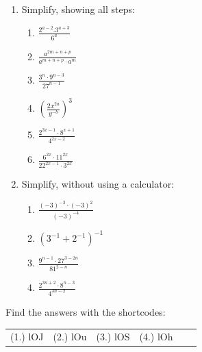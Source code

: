 \begin{enumerate}[noitemsep, label=\textbf{\arabic*}. ]
\begin{enumerate}[noitemsep, label=\textbf{\alph*}. ]
\end{enumerate}
                \label{m38359*uid44}\item Simplify, showing all steps:
\label{m38359*id68378}\begin{enumerate}[noitemsep, label=\textbf{\alph*}. ] 
            \label{m38359*uid45}\item $\frac{{2}^{a-2}.{3}^{a+3}}{{6}^{a}}$\newline
    \label{m38359*uid46}\item $\frac{{a}^{2m+n+p}}{{a}^{m+n+p}\ensuremath{\cdot}{a}^{m}}$\newline
    \label{m38359*uid47}\item $\frac{{3}^{n}\ensuremath{\cdot}{9}^{n-3}}{{27}^{n-1}}$\newline
    \label{m38359*uid48}\item ${\left(\frac{2{x}^{2a}}{{y}^{-b}}\right)}^{3}$\newline
    \newline
    \label{m38359*uid49}\item $\frac{{2}^{3x-1}\ensuremath{\cdot}{8}^{x+1}}{{4}^{2x-2}}$\newline
    \label{m38359*uid50}\item $\frac{{6}^{2x}\ensuremath{\cdot}{11}^{2x}}{{22}^{2x-1}\ensuremath{\cdot}{3}^{2x}}$
\end{enumerate}
                \label{m38359*uid51}\item Simplify, without using a calculator:
\label{m38359*id68759}\begin{enumerate}[noitemsep, label=\textbf{\alph*}. ] 
            \label{m38359*uid52}\item $\frac{{\left(-3\right)}^{-3}\ensuremath{\cdot}{\left(-3\right)}^{2}}{{\left(-3\right)}^{-4}}$\newline
    \label{m38359*uid53}\item ${\left({3}^{-1}+{2}^{-1}\right)}^{-1}$\newline
    \label{m38359*uid54}\item $\frac{{9}^{n-1}\ensuremath{\cdot}{27}^{3-2n}}{{81}^{2-n}}$\newline
    \label{m38359*uid55}\item $\frac{{2}^{3n+2}\ensuremath{\cdot}{8}^{n-3}}{{4}^{3n-2}}$
\end{enumerate}
                \end{enumerate}
  \label{m38359**end}
\par {} Find the answers with the shortcodes:
 \par \begin{tabular}[h]{cccccc}
 (1.) lOJ  &  (2.) lOu  &  (3.) lOS  &  (4.) lOh  & \end{tabular}
